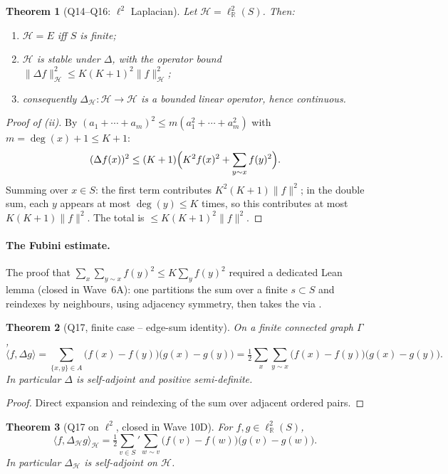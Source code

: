 \documentclass[11pt,a4paper]{article}
\newcommand{\R}{\mathbb{R}}
\newcommand{\HH}{\mathcal{H}}
\newcommand{\Adj}{\sim}
\renewcommand{\deg}{\operatorname{deg}}
\theoremstyle{plain}
\newtheorem{theorem}{Theorem}[section]
\theoremstyle{definition}
\begin{document}
\begin{theorem}[Q14--Q16: $\ell^2$ Laplacian]
Let $\HH = \ell^2_\R(S)$. Then:
\begin{enumerate}[label=(\roman*), leftmargin=2em]
  \item $\HH = E$ iff $S$ is finite;
  \item $\HH$ is stable under $\Delta$, with the operator bound
        $\|\Delta f\|_\HH^2 \leq K(K+1)^2 \|f\|_\HH^2$;
  \item consequently $\Delta_\HH : \HH \to \HH$ is a bounded linear
        operator, hence continuous.
\end{enumerate}
\end{theorem}

\begin{proof}[Proof of (ii)]
By $(a_1 + \cdots + a_m)^2 \leq m(a_1^2 + \cdots + a_m^2)$ with
$m = \deg(x) + 1 \leq K + 1$:
\[
(\Delta f(x))^2 \leq (K+1)\Bigl(K^2 f(x)^2 + \sum_{y \Adj x} f(y)^2\Bigr).
\]
Summing over $x \in S$: the first term contributes $K^2(K+1) \|f\|^2$; in
the double sum, each $y$ appears at most $\deg(y) \leq K$ times, so this
contributes at most $K(K+1)\|f\|^2$. The total is
$\leq K(K+1)^2 \|f\|^2$.
\end{proof}

\paragraph{The Fubini estimate.}
The proof that $\sum_{x}\sum_{y \Adj x} f(y)^2 \leq K \sum_y f(y)^2$
required a dedicated Lean lemma  (closed
in Wave~6A): one partitions the sum over a finite
$s \subset S$ and reindexes by neighbours, using adjacency symmetry,
then takes the  via .

\begin{theorem}[Q17, finite case -- edge-sum identity]\label{thm:edge-sum}
On a finite connected graph $\Gamma$,
\[
\langle f, \Delta g\rangle
= \sum_{\{x, y\} \in A}\bigl(f(x) - f(y)\bigr)\bigl(g(x) - g(y)\bigr)
= \tfrac12\sum_{x}\sum_{y \Adj x}\bigl(f(x) - f(y)\bigr)\bigl(g(x) - g(y)\bigr).
\]
In particular $\Delta$ is self-adjoint and positive semi-definite.
\end{theorem}

\begin{proof} Direct expansion and reindexing of the sum over adjacent
ordered pairs.
\end{proof}

\begin{theorem}[Q17 on $\ell^2$, closed in Wave 10D]\label{thm:edge-sum-l2}
For $f, g \in \ell^2_\R(S)$,
\[
\langle f, \Delta_\HH g\rangle_\HH
= \tfrac12 \sum_{v \in S}' \sum_{w \Adj v}
  \bigl(f(v) - f(w)\bigr)\bigl(g(v) - g(w)\bigr).
\]
In particular $\Delta_\HH$ is self-adjoint on $\HH$.
\end{theorem}
\end{document}
